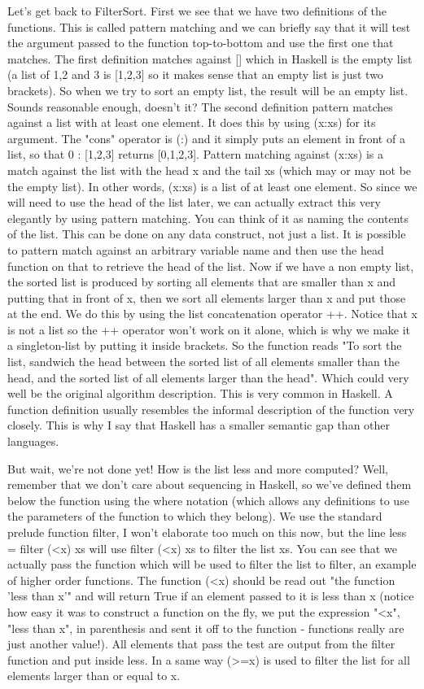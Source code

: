 \documentclass[main.tex]{subfiles}
\begin{document}
{{Let's get back to FilterSort. First we see that we have two definitions of the functions. This is called pattern matching and we can briefly say that it will test the argument passed to the function top-to-bottom and use the first one that matches. The first definition matches against [] which in Haskell is the empty list (a list of 1,2 and 3 is [1,2,3] so it makes sense that an empty list is just two brackets). So when we try to sort an empty list, the result will be an empty list. Sounds reasonable enough, doesn't it? The second definition pattern matches against a list with at least one element. It does this by using (x:xs) for its argument. The "cons" operator is (:) and it simply puts an element in front of a list, so that 0 : [1,2,3] returns [0,1,2,3]. Pattern matching against (x:xs) is a match against the list with the head x and the tail xs (which may or may not be the empty list). In other words, (x:xs) is a list of at least one element. So since we will need to use the head of the list later, we can actually extract this very elegantly by using pattern matching. You can think of it as naming the contents of the list. This can be done on any data construct, not just a list. It is possible to pattern match against an arbitrary variable name and then use the head function on that to retrieve the head of the list. Now if we have a non empty list, the sorted list is produced by sorting all elements that are smaller than x and putting that in front of x, then we sort all elements larger than x and put those at the end. We do this by using the list concatenation operator ++. Notice that x is not a list so the ++ operator won't work on it alone, which is why we make it a singleton-list by putting it inside brackets. So the function reads "To sort the list, sandwich the head between the sorted list of all elements smaller than the head, and the sorted list of all elements larger than the head". Which could very well be the original algorithm description. This is very common in Haskell. A function definition usually resembles the informal description of the function very closely. This is why I say that Haskell has a smaller semantic gap than other languages.

But wait, we're not done yet! How is the list less and more computed? Well, remember that we don't care about sequencing in Haskell, so we've defined them below the function using the where notation (which allows any definitions to use the parameters of the function to which they belong). We use the standard prelude function filter, I won't elaborate too much on this now, but the line less = filter (<x) xs will use filter (<x) xs to filter the list xs. You can see that we actually pass the function which will be used to filter the list to filter, an example of higher order functions. The function (<x) should be read out "the function 'less than x'" and will return True if an element passed to it is less than x (notice how easy it was to construct a function on the fly, we put the expression "<x", "less than x", in parenthesis and sent it off to the function - functions really are just another value!). All elements that pass the test are output from the filter function and put inside less. In a same way (>=x) is used to filter the list for all elements larger than or equal to x.

}}
\end{document}
